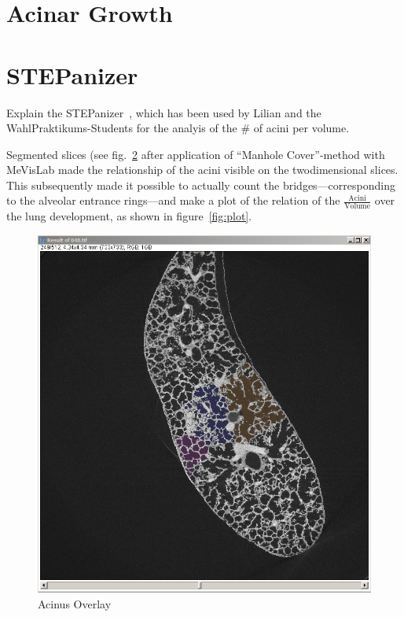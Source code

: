 \begin{figure}
	\label{fig:skeletonization}%
\end{figure}

\section{Acinar Growth}

\section{STEPanizer}
Explain the STEPanizer~\cite{Tschanz2010}, which has been used by Lilian and the WahlPraktikums-Students for the analyis of the \# of acini per volume.

Segmented slices (see fig.~\ref{fig:acinus overlay} after application of ``Manhole Cover''-method with MeVisLab made the relationship of the acini visible on the twodimensional slices. This subsequently made it possible to actually count the bridges---corresponding to the alveolar entrance rings---and make a plot of the relation of the $\frac{\textrm{Acini}}{\textrm{Volume}}$ over the lung development, as shown in figure~\ref{fig:plot}.

\renewcommand{\imsize}{0.618\linewidth}
\begin{figure}
	\centering
	\includegraphics[width=\imsize]{img/Acinus_Overlay}
	\caption{Acinus Overlay}
	\label{fig:acinus overlay}
\end{figure}

